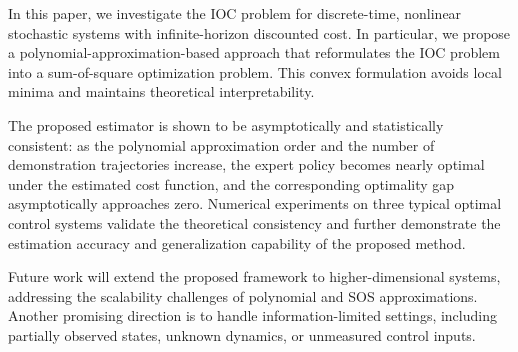 In this paper, we investigate the IOC problem for discrete-time, nonlinear stochastic systems with infinite-horizon discounted cost. 
In particular, we propose a polynomial-approximation-based approach that reformulates the IOC problem into a sum-of-square optimization problem. This convex formulation avoids local minima and maintains theoretical interpretability.

The proposed estimator is shown to be asymptotically and statistically consistent: as the polynomial approximation order and the number of demonstration trajectories increase, the expert policy becomes nearly optimal under the estimated cost function, and the corresponding optimality gap asymptotically approaches zero.
Numerical experiments on three typical optimal control systems validate the theoretical consistency and further demonstrate the estimation accuracy and generalization capability of the proposed method.

Future work will extend the proposed framework to higher-dimensional systems, addressing the scalability challenges of polynomial and SOS approximations.
Another promising direction is to handle information-limited settings, including partially observed states, unknown dynamics, or unmeasured control inputs.
